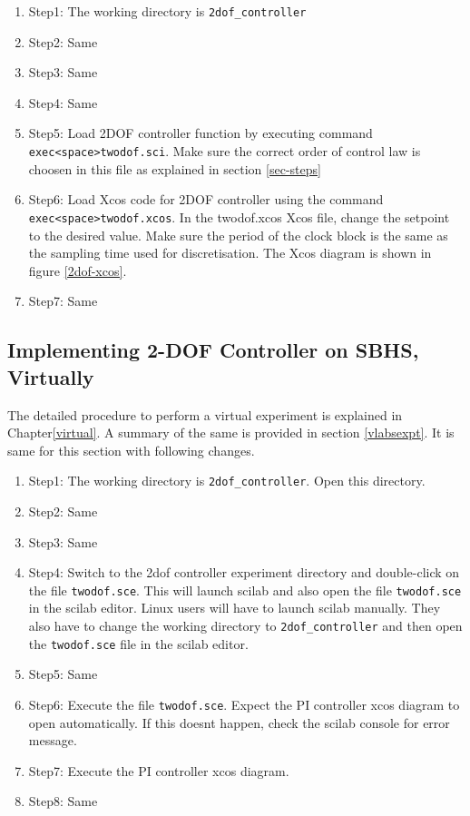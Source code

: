 \begin{enumerate}
\item Step1: The working directory is {\tt 2dof\_controller}
\item Step2: Same
\item Step3: Same
\item Step4: Same
\item Step5: Load 2DOF controller function by executing command\\ {\tt exec<space>twodof.sci}. Make sure the correct order of control law is choosen in this file as explained in section \ref{sec-steps}
\item Step6: Load Xcos code for 2DOF controller using the command\\ {\tt exec<space>twodof.xcos}. In the {\ttfamily twodof.xcos} Xcos file, change the setpoint to the desired value. Make sure the period of the clock block is the same as the sampling time used for discretisation.  The Xcos diagram is shown in figure \ref{2dof-xcos}. 
\item Step7: Same
\end{enumerate}

\subsection{Implementing 2-DOF Controller on SBHS, Virtually}

The detailed procedure to perform a virtual experiment is explained in Chapter\ref{virtual}. A summary of the same is provided in section \ref{vlabsexpt}. It is same for this section with following changes.

\begin{enumerate}
\item Step1: The working directory is {\tt 2dof\_controller}. Open this directory.
\item Step2: Same
\item Step3: Same
\item Step4:  Switch to the 2dof controller experiment directory and double-click on the file {\tt twodof.sce}. This will launch scilab and also open the file {\tt twodof.sce} in the scilab editor. Linux users will have to launch scilab manually. They also have to change the working directory to {\tt 2dof\_controller} and then open the {\tt  twodof.sce} file in the scilab editor.
\item Step5: Same
\item Step6: Execute the file {\tt twodof.sce}.  Expect the PI controller xcos diagram to open automatically. If this doesnt happen, check the scilab console for error message.
\item Step7: Execute the PI controller xcos diagram.
\item Step8: Same
\end{enumerate}

